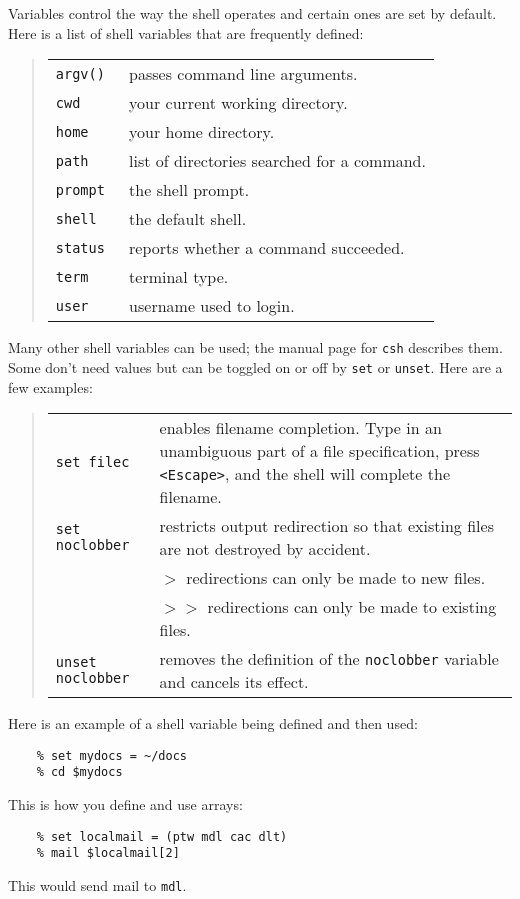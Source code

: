Variables control the way the shell operates and certain ones are set by
default.
Here is a list of shell variables that are frequently defined:
\begin{quote}
\begin{tabular}{lp{4.5in}}
{\tt argv() } & passes command line arguments.              \\
{\tt  cwd   } & your current working directory. \\   
{\tt  home  } & your home directory. \\
{\tt  path  } & list of directories searched for a command.           \\
{\tt  prompt} & the shell prompt.                                     \\
{\tt  shell } & the default shell. \\
{\tt  status} & reports whether a command succeeded.                  \\
{\tt  term  } & terminal type.                                        \\
{\tt  user  } & username used to login.
\end{tabular}
\end{quote}
Many other shell variables can be used; the manual page for {\tt csh}
describes them.
Some don't need values but can be toggled on or off by {\tt set} or {\tt unset}.
Here are a few examples:
\begin{quote}
\begin{tabular}{lp{4.4in}}

{\tt  set filec} & enables filename completion.
   Type in an unambiguous part of a file specification, press {\tt <Escape>},
   and the shell will complete the filename.                     \\

{\tt  set noclobber} & restricts output redirection so that existing
                 files are not destroyed by accident.               \\

                  & {\tt $>$} redirections can only be made to new files.\\

                  & {\tt  $>>$} redirections can only be made to existing
                    files.\\

{\tt  unset noclobber} & removes the definition of the {\tt noclobber} variable
                   and cancels its effect.

\end{tabular}
\end{quote}
Here is an example of a shell variable being defined and then used:
\begin{verbatim}
    % set mydocs = ~/docs
    % cd $mydocs
\end{verbatim}
This is how you define and use arrays:
\begin{verbatim}
    % set localmail = (ptw mdl cac dlt)
    % mail $localmail[2]
\end{verbatim}
This would send mail to {\tt mdl}.

